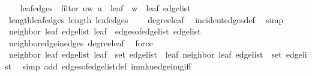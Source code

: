 \begin{isabellebody}
%
\isadelimproof
%
\endisadelimproof
%
\isatagproof
{}\isamarkupfalse%
{\isacharminus}{\kern0pt}\isanewline
\ \ \isamarkupfalse%
\ {\isacharquery}{\kern0pt}leaf{\isacharunderscore}{\kern0pt}edges\ {\isacharequal}{\kern0pt}\ {\isachardoublequoteopen}filter\ {\isacharparenleft}{\kern0pt}{\isasymlambda}{\isacharparenleft}{\kern0pt}u{\isacharcomma}{\kern0pt}w{\isacharparenright}{\kern0pt}{\isachardot}{\kern0pt}\ u\ {\isacharequal}{\kern0pt}\ leaf\ {\isasymor}\ w\ {\isacharequal}{\kern0pt}\ leaf{\isacharparenright}{\kern0pt}\ edge{\isacharunderscore}{\kern0pt}list{\isachardoublequoteclose}\isanewline
\ \ \isamarkupfalse%
\ length{\isacharunderscore}{\kern0pt}leaf{\isacharunderscore}{\kern0pt}edges{\isacharcolon}{\kern0pt}\ {\isachardoublequoteopen}length\ {\isacharquery}{\kern0pt}leaf{\isacharunderscore}{\kern0pt}edges\ {\isacharequal}{\kern0pt}\ {}{\isachardoublequoteclose}\ \isamarkupfalse%
\ degree{\isacharunderscore}{\kern0pt}leaf\ \isamarkupfalse%
\ incident{\isacharunderscore}{\kern0pt}edges{\isacharunderscore}{\kern0pt}def\ \isamarkupfalse%
\ simp\isanewline
\ \ \isamarkupfalse%
\ {\isachardoublequoteopen}{\isacharbraceleft}{\kern0pt}neighbor\ leaf\ edge{\isacharunderscore}{\kern0pt}list{\isacharcomma}{\kern0pt}\ leaf{\isacharbraceright}{\kern0pt}\ {\isasymin}\ edges{\isacharunderscore}{\kern0pt}of{\isacharunderscore}{\kern0pt}edge{\isacharunderscore}{\kern0pt}list\ edge{\isacharunderscore}{\kern0pt}list{\isachardoublequoteclose}\ \isamarkupfalse%
\ neighbor{\isacharunderscore}{\kern0pt}edge{\isacharunderscore}{\kern0pt}in{\isacharunderscore}{\kern0pt}edges\ degree{\isacharunderscore}{\kern0pt}leaf\ \isamarkupfalse%
\ force\isanewline
\ \ \isamarkupfalse%
\ \isamarkupfalse%
\ {\isachardoublequoteopen}{\isacharparenleft}{\kern0pt}neighbor\ leaf\ edge{\isacharunderscore}{\kern0pt}list{\isacharcomma}{\kern0pt}\ leaf{\isacharparenright}{\kern0pt}\ {\isasymin}\ set\ edge{\isacharunderscore}{\kern0pt}list\ {\isasymor}\ {\isacharparenleft}{\kern0pt}leaf{\isacharcomma}{\kern0pt}\ neighbor\ leaf\ edge{\isacharunderscore}{\kern0pt}list{\isacharparenright}{\kern0pt}\ {\isasymin}\ set\ edge{\isacharunderscore}{\kern0pt}list{\isachardoublequoteclose}\ \isamarkupfalse%
\ {\isacharparenleft}{\kern0pt}simp\ add{\isacharcolon}{\kern0pt}\ edges{\isacharunderscore}{\kern0pt}of{\isacharunderscore}{\kern0pt}edge{\isacharunderscore}{\kern0pt}list{\isacharunderscore}{\kern0pt}def\ in{\isacharunderscore}{\kern0pt}mk{\isacharunderscore}{\kern0pt}uedge{\isacharunderscore}{\kern0pt}img{\isacharunderscore}{\kern0pt}iff{\isacharparenright}{\kern0pt}\isanewline

\end{isabellebody}
